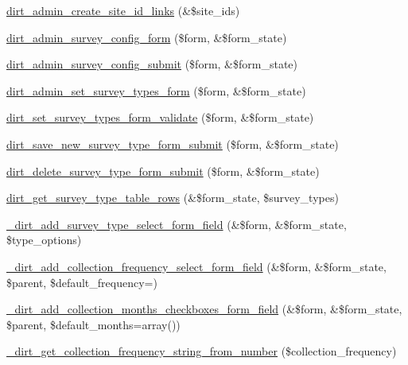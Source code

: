 \begin{DoxyCompactItemize}
\item 
\mbox{\hyperlink{dirt_8admin_8inc_a5c27800ee9fcfd90f68ed95877f34ab4}{dirt\+\_\+admin\+\_\+create\+\_\+site\+\_\+id\+\_\+links}} (\&\$site\+\_\+ids)
\item 
\mbox{\hyperlink{dirt_8admin_8inc_af1f5065a62a0b862e0b66a5f6e8af93e}{dirt\+\_\+admin\+\_\+survey\+\_\+config\+\_\+form}} (\$form, \&\$form\+\_\+state)
\item 
\mbox{\hyperlink{dirt_8admin_8inc_af8f21832cfbbeb987eef463e69e38aa8}{dirt\+\_\+admin\+\_\+survey\+\_\+config\+\_\+submit}} (\$form, \&\$form\+\_\+state)
\item 
\mbox{\hyperlink{dirt_8admin_8inc_a5eb6e4e6a1cbb3b026a8285806d79abe}{dirt\+\_\+admin\+\_\+set\+\_\+survey\+\_\+types\+\_\+form}} (\$form, \&\$form\+\_\+state)
\item 
\mbox{\hyperlink{dirt_8admin_8inc_aa6b844bb45db927d99235b3de5ec5028}{dirt\+\_\+set\+\_\+survey\+\_\+types\+\_\+form\+\_\+validate}} (\$form, \&\$form\+\_\+state)
\item 
\mbox{\hyperlink{dirt_8admin_8inc_afdc8a0d3ffff319e51c7fbea9423a6f6}{dirt\+\_\+save\+\_\+new\+\_\+survey\+\_\+type\+\_\+form\+\_\+submit}} (\$form, \&\$form\+\_\+state)
\item 
\mbox{\hyperlink{dirt_8admin_8inc_ac3eefca52ed6b3f043f29813d223fb8e}{dirt\+\_\+delete\+\_\+survey\+\_\+type\+\_\+form\+\_\+submit}} (\$form, \&\$form\+\_\+state)
\item 
\mbox{\hyperlink{dirt_8admin_8inc_ad633a5c40fe533fc749cd05709de5084}{dirt\+\_\+get\+\_\+survey\+\_\+type\+\_\+table\+\_\+rows}} (\&\$form\+\_\+state, \$survey\+\_\+types)
\item 
\mbox{\hyperlink{dirt_8admin_8inc_a72a35f93a5bd9e77e1d48f0a06adb643}{\+\_\+dirt\+\_\+add\+\_\+survey\+\_\+type\+\_\+select\+\_\+form\+\_\+field}} (\&\$form, \&\$form\+\_\+state, \$type\+\_\+options)
\item 
\mbox{\hyperlink{dirt_8admin_8inc_aeb95d3ed988f903e75e192981c76c520}{\+\_\+dirt\+\_\+add\+\_\+collection\+\_\+frequency\+\_\+select\+\_\+form\+\_\+field}} (\&\$form, \&\$form\+\_\+state, \$parent, \$default\+\_\+frequency=\textquotesingle{}\textquotesingle{})
\item 
\mbox{\hyperlink{dirt_8admin_8inc_a19ad71ebf75dd8ceaae840486c10eedb}{\+\_\+dirt\+\_\+add\+\_\+collection\+\_\+months\+\_\+checkboxes\+\_\+form\+\_\+field}} (\&\$form, \&\$form\+\_\+state, \$parent, \$default\+\_\+months=array())
\item 
\mbox{\hyperlink{dirt_8admin_8inc_af493b928fb7e8c57f324f6764aed5e61}{\+\_\+dirt\+\_\+get\+\_\+collection\+\_\+frequency\+\_\+string\+\_\+from\+\_\+number}} (\$collection\+\_\+frequency)
\end{DoxyCompactItemize}


